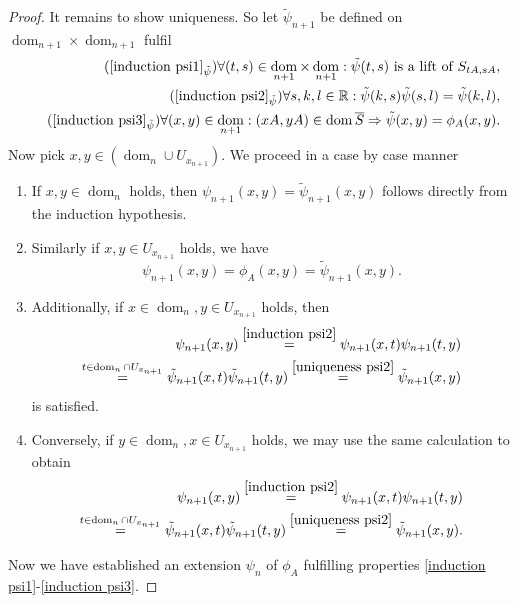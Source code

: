 \documentclass[b5paper,draft,openbib,12pt]{memoir}
\DeclareMathOperator{\dom}{dom}
\begin{document}
\begin{proof}
It remains to show uniqueness. 
So let \(\tilde{\psi}_{n+1}\) be defined 
on \(\dom_{n+1}\times\dom_{n+1}\) fulfil 
 \begin{align}\label{uniqueness psi1}\tag{\(\ref{induction psi1}_{\tilde{\psi}}\)}
  \forall (t,s)\in \dom_{n+1}\times \dom_{n+1}: \tilde{\psi}(t,s) \text{ is a lift of } S_{tA, sA},\\\label{uniqueness psi2}\tag{\(\ref{induction psi2}_{\tilde{\psi}}\)}
\forall s,k,l\in\mathbb{R}: \tilde{\psi}(k,s)\tilde{\psi}(s,l)=\tilde{\psi}(k,l),\\\label{uniqueness psi3}\tag{\(\ref{induction psi3}_{\tilde{\psi}}\)}
\forall (x,y)\in\dom_{n+1}: (xA, yA)\in\dom\overline{S}\Rightarrow  \tilde{\psi}(x,y)=\phi_A(x,y).
\end{align}
Now pick \(x,y \in (\dom_n\cup U_{x_{n+1}})\). We proceed 
in a case by case manner
\begin{enumerate}
\item If \(x,y\in\dom_n\) holds, then 
\(\psi_{n+1}(x,y)=\tilde{\psi}_{n+1}(x,y)\) follows directly
from the induction hypothesis.
\item Similarly if \(x,y\in U_{x_{n+1}}\) holds, we have
\begin{equation}
  \psi_{n+1}(x,y)=\phi_A(x,y)=\tilde{\psi}_{n+1}(x,y).
\end{equation}
\item Additionally, if 
\(x\in \dom_n, y \in U_{x_{n+1}}\) holds, then 
\begin{align}
\psi_{n+1}(x,y)
\overset{\eqref{induction psi2}}{=}
\psi_{n+1}(x,t)\psi_{n+1}(t,y)\\
\overset{t\in \dom_n\cap U_{x_{n+1}}}{=}\tilde{\psi}_{n+1}(x,t)\tilde{\psi}_{n+1}(t,y)
\overset{\eqref{uniqueness psi2}}{=}
\tilde{\psi}_{n+1}(x,y)
\end{align}
is satisfied. 
\item Conversely, if 
\(y\in \dom_n, x \in U_{x_{n+1}}\) holds, we may 
use the same calculation to obtain 
\begin{align}
\psi_{n+1}(x,y)
\overset{\eqref{induction psi2}}{=}
\psi_{n+1}(x,t)\psi_{n+1}(t,y)\\
\overset{t\in \dom_n\cap U_{x_{n+1}}}{=}\tilde{\psi}_{n+1}(x,t)\tilde{\psi}_{n+1}(t,y)
\overset{\eqref{uniqueness psi2}}{=}
\tilde{\psi}_{n+1}(x,y).
\end{align}
\end{enumerate}

Now we have established an extension \(\psi_n\) of \(\phi_A\)
fulfilling properties \eqref{induction psi1}-\eqref{induction psi3}.


\end{proof}
\end{document}
